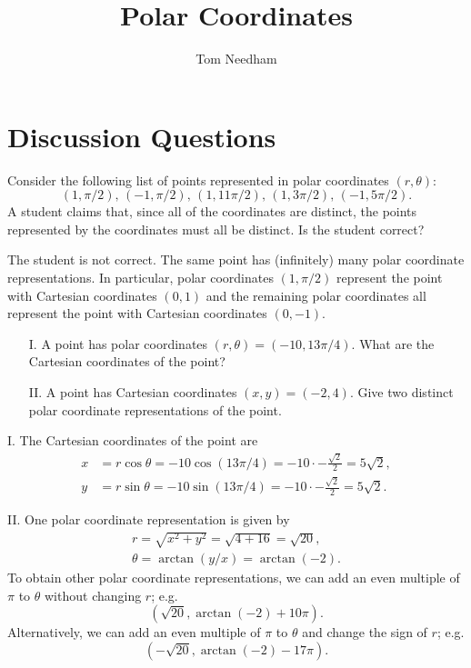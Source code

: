 \documentclass[]{ximera}
\author{Tom Needham}
\title[Collaborate:]{Polar Coordinates}
\begin{document}
\begin{abstract}
\end{abstract}
\maketitle

\section{Discussion Questions}

\begin{problem}
Consider the following list of points represented in polar coordinates $(r,\theta)$:
$$
(1,\pi/2), \, (-1,\pi/2),\,  (1,11\pi/2), \, (1,3\pi/2), \, (-1,5\pi/2).
$$
A student claims that, since all of the coordinates are distinct, the points represented by the coordinates must all be distinct. Is the student correct?
\begin{solution}
The student is not correct. The same point has (infinitely) many polar coordinate representations. In particular, polar coordinates $(1,\pi/2)$ represent the point with Cartesian coordinates $(0,1)$ and the remaining polar coordinates all represent the point with Cartesian coordinates $(0,-1)$.
\end{solution}
\end{problem}

\begin{problem}
\begin{itemize}
\item[I.] A point has polar coordinates $(r,\theta)=(-10,13\pi/4)$. What are the Cartesian coordinates of the point?

\item[II.] A point has Cartesian coordinates $(x,y)=(-2,4)$. Give two distinct polar coordinate representations of the point.
\end{itemize}

\begin{solution}
I. The Cartesian coordinates of the point are 
\begin{align*}
x&= r \cos \theta = -10 \cos (13\pi/4) = -10 \cdot -\frac{\sqrt{2}}{2} = 5 \sqrt{2}, \\
y &= r \sin \theta = -10 \sin (13 \pi/ 4) = -10 \cdot -\frac{\sqrt{2}}{2} = 5 \sqrt{2}.
\end{align*}

II. One polar coordinate representation is given by
\begin{align*}
r = \sqrt{x^2 + y^2} = \sqrt{4 + 16} = \sqrt{20}, \\
\theta = \arctan (y/x) = \arctan (-2).
\end{align*}
To obtain other polar coordinate representations, we can add an even multiple of $\pi$ to $\theta$ without changing $r$; e.g.
$$
\left(\sqrt{20},\arctan(-2) + 10 \pi \right).
$$
Alternatively, we can add an even multiple of $\pi$ to $\theta$ and change the sign of $r$; e.g.
$$
\left(-\sqrt{20},\arctan(-2)-17 \pi\right).
$$
\end{solution}
\end{problem}
\end{document}
